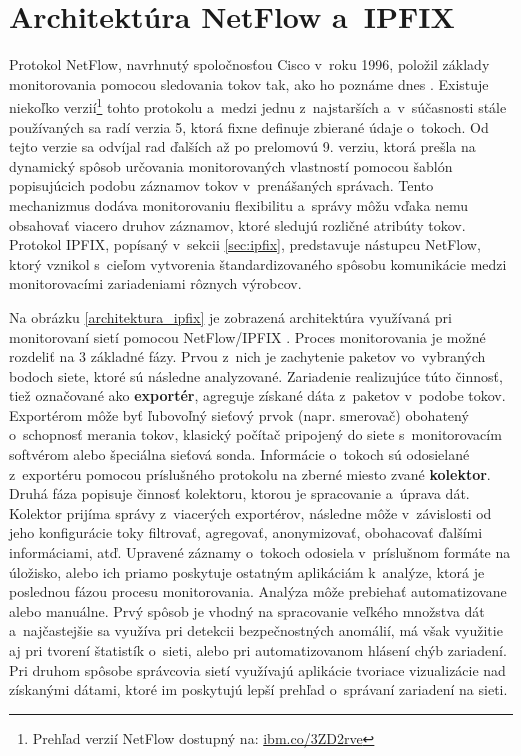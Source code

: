 \section{Architektúra NetFlow a~IPFIX}
\label{sec:ipfix_architektura}

Protokol NetFlow, navrhnutý spoločnosťou Cisco v~roku 1996, položil základy monitorovania pomocou sledovania tokov tak, ako ho poznáme dnes \cite{vyvoj_netflow}. Existuje niekoľko
verzií\footnote{Prehľad verzií NetFlow dostupný na: \href{https://ibm.co/3ZD2rve}{ibm.co/3ZD2rve}} tohto protokolu a~medzi jednu z~najstarších a~v~súčasnosti stále používaných sa radí verzia 5, ktorá fixne definuje zbierané údaje
o~tokoch. Od tejto verzie sa odvíjal rad ďalších až po prelomovú 9. verziu, ktorá prešla na dynamický spôsob určovania monitorovaných vlastností pomocou šablón popisujúcich podobu záznamov tokov v~prenášaných správach. Tento mechanizmus dodáva monitorovaniu
flexibilitu a~správy môžu vďaka nemu obsahovať viacero druhov záznamov, ktoré sledujú rozličné atribúty tokov. Protokol IPFIX, popísaný v~sekcii \ref{sec:ipfix}, predstavuje nástupcu NetFlow, ktorý vznikol s~cieľom vytvorenia štandardizovaného spôsobu komunikácie
medzi monitorovacími zariadeniami rôznych výrobcov.

Na obrázku \ref{architektura_ipfix} je zobrazená architektúra využívaná pri monitorovaní sietí pomocou \mbox{NetFlow/IPFIX} \cite{ipfix_architektura}. Proces monitorovania je možné rozdeliť na 3 základné fázy. Prvou z~nich je zachytenie paketov vo~vybraných bodoch siete,
ktoré sú následne analyzované. Zariadenie realizujúce túto činnosť, tiež označované ako \textbf{exportér}, agreguje získané dáta z~paketov v~podobe tokov. Exportérom môže byť ľubovoľný sieťový prvok (napr. smerovač) obohatený o~schopnosť merania tokov, klasický počítač
pripojený do siete s~monitorovacím softvérom alebo špeciálna sieťová sonda. Informácie o~tokoch sú odosielané z~exportéru pomocou príslušného protokolu na zberné miesto zvané \textbf{kolektor}. Druhá fáza popisuje činnosť kolektoru, ktorou je
spracovanie a~úprava dát. Kolektor prijíma správy z~viacerých exportérov, následne môže v~závislosti od jeho konfigurácie toky filtrovať, agregovať, anonymizovať, obohacovať ďalšími informáciami, atď. Upravené záznamy o~tokoch odosiela v~príslušnom formáte na úložisko, alebo
ich priamo poskytuje ostatným aplikáciám k~analýze, ktorá je poslednou fázou procesu monitorovania. Analýza môže prebiehať automatizovane alebo manuálne. Prvý spôsob je vhodný na spracovanie veľkého množstva dát a~najčastejšie sa využíva pri detekcii bezpečnostných anomálií,
má však využitie aj pri tvorení štatistík o~sieti, alebo pri automatizovanom hlásení chýb zariadení. Pri druhom spôsobe správcovia sietí využívajú aplikácie tvoriace vizualizácie nad získanými dátami, ktoré im poskytujú lepší prehľad o~správaní zariadení na sieti.

